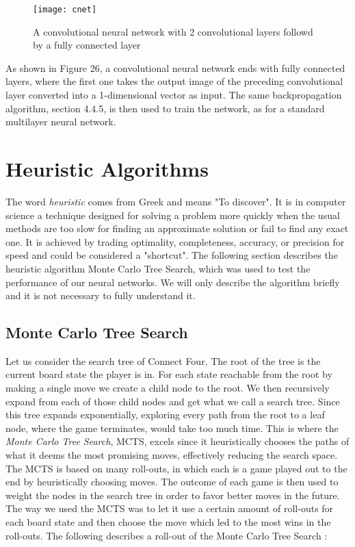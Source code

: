 \documentclass[titlepage]{article}
\begin{document}
\vskip 0.4cm

\begin{figure}[h]
    \center
    \texttt{[image: cnet]}
    \vskip 0.4cm
    \caption{A convolutional neural network with 2 convolutional layers followd by a fully connected layer}
\end{figure}

\vskip 0.2cm

\noindent
As shown in Figure 26, a convolutional neural network ends with fully connected layers, where the first one takes the output image of the preceding convolutional layer converted into a 1-dimensional vector as input. The same backpropagation algorithm, section 4.4.5, is then used to train the network, as for a standard multilayer neural network.

\newpage

\section{Heuristic Algorithms}

\vskip 0.3cm

The word \emph{heuristic} comes from Greek and means "To discover". It is in computer science a technique designed for solving a problem more quickly when the usual methods are too slow for finding an approximate solution or fail to find any exact one. It is achieved by trading optimality, completeness, accuracy, or precision for speed and could be considered a "shortcut". The following section describes the heuristic algorithm Monte Carlo Tree Search, which was used to test the performance of our neural networks. We will only describe the algorithm briefly and it is not necessary to fully understand it.

\subsection{Monte Carlo Tree Search}

\vskip 0.2cm

Let us consider the search tree of Connect Four. The root of the tree is the current board state the player is in. For each state reachable from the root by making a single move we create a child node to the root. We then recursively expand from each of those child nodes and get what we call a search tree. Since this tree expands exponentially, exploring every path from the root to a leaf node, where the game terminates, would take too much time. This is where the \emph{Monte Carlo Tree Search}, MCTS, excels since it heuristically chooses the paths of what it deems the most promising moves, effectively reducing the search space. The MCTS is based on many roll-outs, in which each is a game played out to the end by heuristically choosing moves. The outcome of each game is then used to weight the nodes in the search tree in order to favor better moves in the future. The way we used the MCTS was to let it use a certain amount of roll-outs for each board state and then choose the move which led to the most wins in the roll-outs. The following describes a roll-out of the Monte Carlo Tree Search \cite{mcts}:
\end{document}
